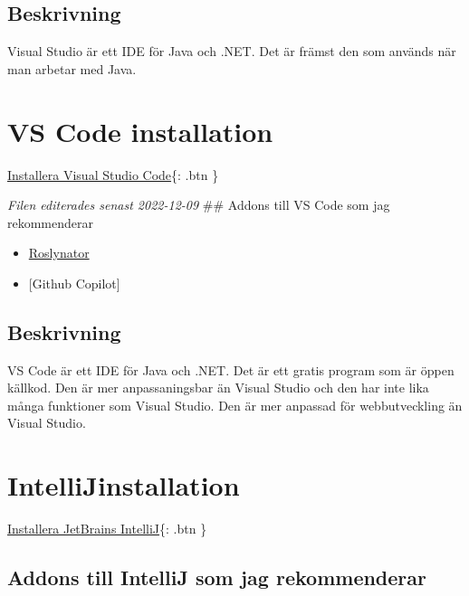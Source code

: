 \hypertarget{beskrivning}{%
\subsection{Beskrivning}\label{beskrivning}}

Visual Studio är ett IDE för Java och .NET. Det är främst den som
används när man arbetar med Java.

\hypertarget{vs-code-installation}{%
\section{VS Code installation}\label{vs-code-installation}}

\href{https://code.visualstudio.com/}{Installera Visual Studio Code}\{:
.btn \}

\emph{Filen editerades senast 2022-12-09} \#\# Addons till VS Code som
jag rekommenderar

\begin{itemize}
\tightlist
\item
  \href{https://marketplace.visualstudio.com/items?itemName=josefpihrt-vscode.roslynator}{Roslynator}
\item
  {[}Github Copilot{]}
\end{itemize}

\hypertarget{beskrivning}{%
\subsection{Beskrivning}\label{beskrivning}}

VS Code är ett IDE för Java och .NET. Det är ett gratis program som är
öppen källkod. Den är mer anpassaningsbar än Visual Studio och den har
inte lika många funktioner som Visual Studio. Den är mer anpassad för
webbutveckling än Visual Studio.

\hypertarget{intellijinstallation}{%
\section{IntelliJinstallation}\label{intellijinstallation}}

\href{https://www.jetbrains.com/idea/}{Installera JetBrains IntelliJ}\{:
.btn \}

\hypertarget{addons-till-intellij-som-jag-rekommenderar}{%
\subsection{Addons till IntelliJ som jag
rekommenderar}\label{addons-till-intellij-som-jag-rekommenderar}}

